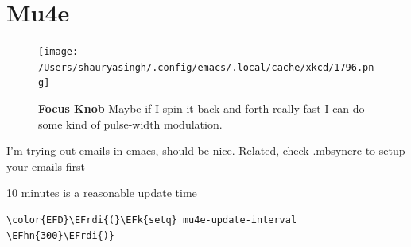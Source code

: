 \documentclass{scrartcl}
\newcommand{\EFk}[1]{\textcolor{EFk}{#1}} %
\newcommand{\EFhn}[1]{#1} %
\newcommand{\EFrdi}[1]{#1} %
\begin{document}
\section{Mu4e}
\label{sec:orgac4ae11}
\begin{figure}[!htb]
    \centering
    \texttt{[image: /Users/shauryasingh/.config/emacs/.local/cache/xkcd/1796.png]}
  \caption*{\label{xkcd:1796} \textbf{Focus Knob} Maybe if I spin it back and forth really fast I can do some kind of pulse-width modulation.}
  \end{figure}
I'm trying out emails in emacs, should be nice. Related, check .mbsyncrc to
setup your emails first

10 minutes is a reasonable update time
\begin{Code}
\begin{Verbatim}[]
\color{EFD}\EFrdi{(}\EFk{setq} mu4e-update-interval \EFhn{300}\EFrdi{)}
\end{Verbatim}
\end{Code}
\end{document}

